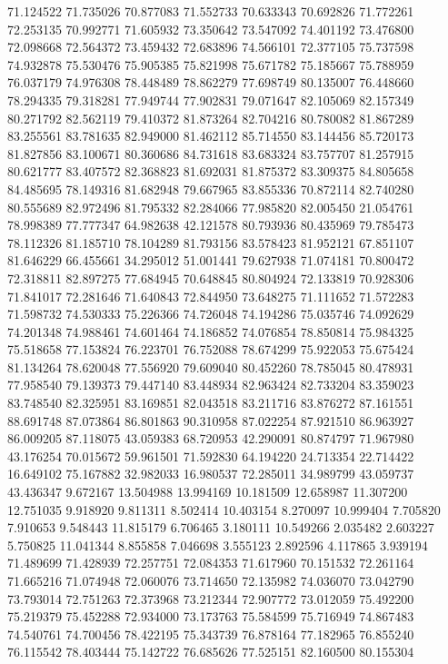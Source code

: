 71.124522
71.735026
70.877083
71.552733
70.633343
70.692826
71.772261
72.253135
70.992771
71.605932
73.350642
73.547092
74.401192
73.476800
72.098668
72.564372
73.459432
72.683896
74.566101
72.377105
75.737598
74.932878
75.530476
75.905385
75.821998
75.671782
75.185667
75.788959
76.037179
74.976308
78.448489
78.862279
77.698749
80.135007
76.448660
78.294335
79.318281
77.949744
77.902831
79.071647
82.105069
82.157349
80.271792
82.562119
79.410372
81.873264
82.704216
80.780082
81.867289
83.255561
83.781635
82.949000
81.462112
85.714550
83.144456
85.720173
81.827856
83.100671
80.360686
84.731618
83.683324
83.757707
81.257915
80.621777
83.407572
82.368823
81.692031
81.875372
83.309375
84.805658
84.485695
78.149316
81.682948
79.667965
83.855336
70.872114
82.740280
80.555689
82.972496
81.795332
82.284066
77.985820
82.005450
21.054761
78.998389
77.777347
64.982638
42.121578
80.793936
80.435969
79.785473
78.112326
81.185710
78.104289
81.793156
83.578423
81.952121
67.851107
81.646229
66.455661
34.295012
51.001441
79.627938
71.074181
70.800472
72.318811
82.897275
77.684945
70.648845
80.804924
72.133819
70.928306
71.841017
72.281646
71.640843
72.844950
73.648275
71.111652
71.572283
71.598732
74.530333
75.226366
74.726048
74.194286
75.035746
74.092629
74.201348
74.988461
74.601464
74.186852
74.076854
78.850814
75.984325
75.518658
77.153824
76.223701
76.752088
78.674299
75.922053
75.675424
81.134264
78.620048
77.556920
79.609040
80.452260
78.785045
80.478931
77.958540
79.139373
79.447140
83.448934
82.963424
82.733204
83.359023
83.748540
82.325951
83.169851
82.043518
83.211716
83.876272
87.161551
88.691748
87.073864
86.801863
90.310958
87.022254
87.921510
86.963927
86.009205
87.118075
43.059383
68.720953
42.290091
80.874797
71.967980
43.176254
70.015672
59.961501
71.592830
64.194220
24.713354
22.714422
16.649102
75.167882
32.982033
16.980537
72.285011
34.989799
43.059737
43.436347
9.672167
13.504988
13.994169
10.181509
12.658987
11.307200
12.751035
9.918920
9.811311
8.502414
10.403154
8.270097
10.999404
7.705820
7.910653
9.548443
11.815179
6.706465
3.180111
10.549266
2.035482
2.603227
5.750825
11.041344
8.855858
7.046698
3.555123
2.892596
4.117865
3.939194
71.489699
71.428939
72.257751
72.084353
71.617960
70.151532
72.261164
71.665216
71.074948
72.060076
73.714650
72.135982
74.036070
73.042790
73.793014
72.751263
72.373968
73.212344
72.907772
73.012059
75.492200
75.219379
75.452288
72.934000
73.173763
75.584599
75.716949
74.867483
74.540761
74.700456
78.422195
75.343739
76.878164
77.182965
76.855240
76.115542
78.403444
75.142722
76.685626
77.525151
82.160500
80.155304
